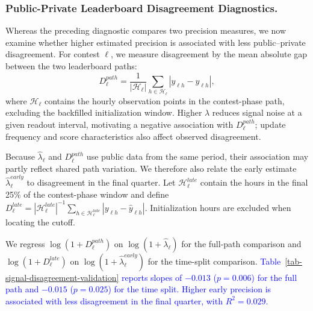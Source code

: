 \documentclass[mnsc]{informs3}
\begin{document}
\subsubsection{Public-Private Leaderboard Disagreement Diagnostics.}
{Whereas the preceding diagnostic compares two precision measures, we now examine whether higher estimated precision is associated with less public--private disagreement. For contest $\ell$, we measure disagreement by the mean absolute gap between the two leaderboard paths:}
\[
D_\ell^{path}
=
\frac{1}{|\mathcal H_\ell|}
\sum_{h\in\mathcal H_\ell}
\left|y_{\ell h}-\hat y_{\ell h}\right|,
\]
{where $\mathcal H_\ell$ contains the hourly observation points in the contest-phase path, excluding the backfilled initialization window. Higher $\lambda$ reduces signal noise at a given readout interval, motivating a negative association with $D_\ell^{path}$; update frequency and score characteristics also affect observed disagreement.}

{Because $\hat\lambda_\ell$ and $D_\ell^{path}$ use public data from the same period, their association may partly reflect shared path variation. We therefore also relate the early estimate $\hat\lambda_\ell^{early}$ to disagreement in the final quarter. Let $\mathcal H_\ell^{late}$ contain the hours in the final 25\% of the contest-phase window and define $D_\ell^{late}=|\mathcal H_\ell^{late}|^{-1}\sum_{h\in\mathcal H_\ell^{late}}|y_{\ell h}-\hat y_{\ell h}|$. Initialization hours are excluded when locating the cutoff.}

{We regress $\log(1+D_\ell^{path})$ on $\log(1+\hat\lambda_\ell)$ for the full-path comparison and $\log(1+D_\ell^{late})$ on $\log(1+\hat\lambda_\ell^{early})$ for the time-split comparison.}
\textcolor{blue}{Table~\ref{tab-signal-disagreement-validation} reports slopes of $-0.013$ ($p=0.006$) for the full path and $-0.015$ ($p=0.025$) for the time split. Higher early precision is associated with less disagreement in the final quarter, with $R^2=0.029$.}
\end{document}
